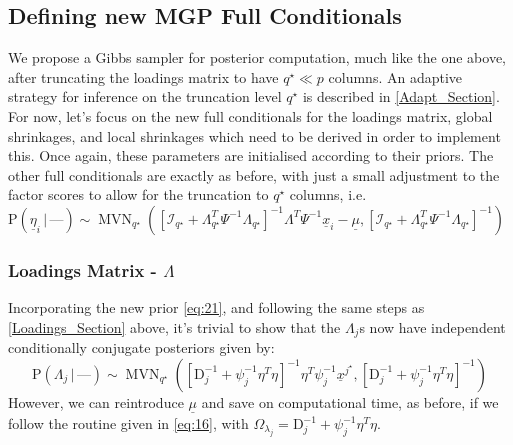 \documentclass[a4paper,12pt,fleqn]{article}
\numberwithin{equation}{section}
\def\given{\,|\,}
\begin{document}
\subsection[Defining new MGP Full Conditionals]{Defining new MGP Full Conditionals}
We propose a Gibbs sampler for posterior computation, much like the one above, after truncating the loadings matrix to have $q^\star \ll p$ columns. An adaptive strategy for inference on the truncation level $q^\star$ is described in \ref{Adapt_Section}. For now, let's focus on the new full conditionals for the loadings matrix, global shrinkages, and local shrinkages which need to be derived in order to implement this. Once again, these parameters are initialised according to their priors. The other full conditionals are exactly as before, with just a small adjustment to the factor scores to allow for the truncation to $q^\star$ columns, i.e. $\mathrm{P}\left(\underline{\eta}_i \given \mbox{---}\right) \sim  \operatorname{MVN}_{q^\star}\left(\left[\mathcal{I}_{q^\star} + \Lambda^T_{q^\star}\Psi^{-1}\Lambda_{q^\star}\right]^{-1}\Lambda^T\Psi^{-1}\underline{x}_i - \underline{\mu},\left[\mathcal{I}_{q^\star} + \Lambda^T_{q^\star}\Psi^{-1}\Lambda_{q^\star}\right]^{-1}\right)$

\subsubsection[Loadings Matrix]{Loadings Matrix - $\Lambda$}
Incorporating the new prior \eqref{eq:21}, and following the same steps as \ref{Loadings_Section} above, it's trivial to show that the $\Lambda_j$s now have independent conditionally conjugate posteriors given by$\colon$
\begin{equation}
\mathrm{P}\left(\Lambda_j\given \mbox{---}\right) \sim \operatorname{MVN}_{q^\star}\left(\left[\mathrm{D}_j^{-1} + \psi_j^{-1}\eta^T\eta\right]^{-1}\eta^T\psi_j^{-1}\underline{x}^{j^\star},\left[\mathrm{D}_j^{-1} + \psi_j^{-1}\eta^T\eta\right]^{-1}\right)\label{eq:24}\end{equation}
\noindent However, we can reintroduce $\underline{\mu}$ and save on computational time, as before, if we follow the routine given in \eqref{eq:16}, with $\Omega_{\lambda_j} = \mathrm{D}_j^{-1} + \psi_j^{-1}\eta^T\eta$.
\end{document}
